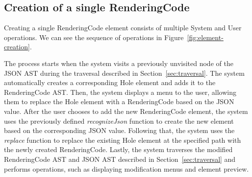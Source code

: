 \subsection{Creation of a single RenderingCode}

Creating a single RenderingCode element consists of multiple System and User operations.
We can see the sequence of operations in Figure~\ref{fig:element-creation}.

The process starts when the system visits a previously unvisited node of the JSON AST during the traversal described in Section~\ref{sec:traversal}.
The system automatically creates a corresponding Hole element and adds it to the RenderingCode AST.
Then, the system displays a menu to the user, allowing them to replace the Hole element with a RenderingCode based on the JSON value.
After the user chooses to add the new RenderingCode element, the system uses the previously defined \emph{recognizeJson} function to create the new element based on the corresponding JSON value.
Following that, the system uses the \emph{replace} function to replace the existing Hole element at the specified path with the newly created RenderingCode.
Lastly, the system traverses the modified RenderingCode AST and JSON AST described in Section~\ref{sec:traversal} and performs operations, such as displaying modification menus and element preview.

